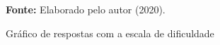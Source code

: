 \begin{figure}[ht!]
\centering

\caption{\textmd{Gráfico de respostas com a escala de dificuldade}}
\label{fig:dificuldadendevesp}

\par\medskip\textbf{Fonte:} Elaborado pelo autor (2020). \par\medskip

\end{figure}

